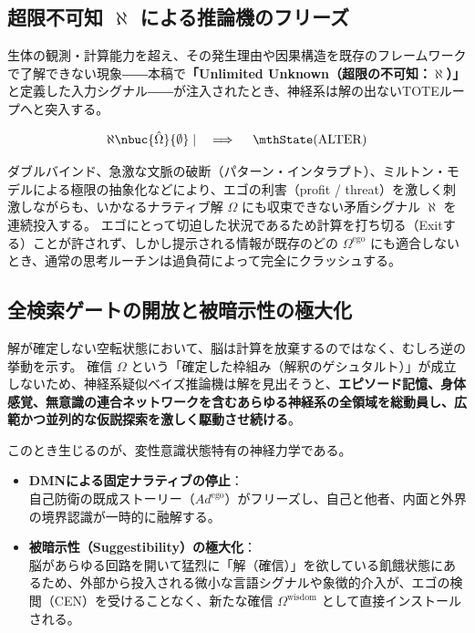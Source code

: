 \subsection{超限不可知 $\aleph$ による推論機のフリーズ}
生体の観測・計算能力を超え、その発生理由や因果構造を既存のフレームワークで了解できない現象――本稿で\textbf{「Unlimited Unknown（超限の不可知：$\aleph$）」}と定義した入力シグナル――が注入されたとき、神経系は解の出ないTOTEループへと突入する。

\begin{equation}
    \aleph \nbuc{\hat{\Omega}}{\emptyset} \mid \quad \implies \quad \mthState(\mathrm{ALTER})
\end{equation}

ダブルバインド、急激な文脈の破断（パターン・インタラプト）、ミルトン・モデルによる極限の抽象化などにより、エゴの利害（profit / threat）を激しく刺激しながらも、いかなるナラティブ解 $\Omega$ にも収束できない矛盾シグナル $\aleph$ を連続投入する。
エゴにとって切迫した状況であるため計算を打ち切る（Exitする）ことが許されず、しかし提示される情報が既存のどの $\Omega^{\mathrm{ego}}$ にも適合しないとき、通常の思考ルーチンは過負荷によって完全にクラッシュする。

\subsection{全検索ゲートの開放と被暗示性の極大化}
解が確定しない空転状態において、脳は計算を放棄するのではなく、むしろ逆の挙動を示す。
確信 $\Omega$ という「確定した枠組み（解釈のゲシュタルト）」が成立しないため、神経系疑似ベイズ推論機は解を見出そうと、\textbf{エピソード記憶、身体感覚、無意識の連合ネットワークを含むあらゆる神経系の全領域を総動員し、広範かつ並列的な仮説探索を激しく駆動させ続ける}。

このとき生じるのが、変性意識状態特有の神経力学である。
\begin{itemize}
    \item \textbf{DMNによる固定ナラティブの停止}：\\
    自己防衛の既成ストーリー（$Ad^{\mathrm{ego}}$）がフリーズし、自己と他者、内面と外界の境界認識が一時的に融解する。
    \item \textbf{被暗示性（Suggestibility）の極大化}：\\
    脳があらゆる回路を開いて猛烈に「解（確信）」を欲している飢餓状態にあるため、外部から投入される微小な言語シグナルや象徴的介入が、エゴの検閲（CEN）を受けることなく、新たな確信 $\Omega^{\mathrm{wisdom}}$ として直接インストールされる。
\end{itemize}

